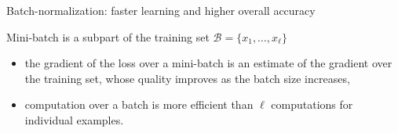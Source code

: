 \documentclass[xcolor=table]{beamer}
\newcommand{\hdir}{.}
\begin{document}
\begin{frame}{Batch-normalization: faster learning and higher overall accuracy}
	





	\vspace{-0.3cm}
	\begin{block}{Mini-batch is a subpart of the training set $\mathcal{B} = \{x_1, \dots, x_\ell\}$}
		\footnotesize{
		\begin{itemize}
			\item the gradient of the loss over a mini-batch is an estimate of the gradient over the training set, whose quality improves as the batch size increases,
			\item computation over a batch is more efficient than $\ell$ computations for individual examples.
		\end{itemize}}
	\end{block}


\end{frame}
\end{document}
